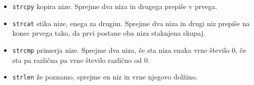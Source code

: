 \begin{itemize}
    \item \verb+strcpy+ kopira nize. Sprejme dva niza in drugega prepiše v
        prvega.
    \item \verb+strcat+ stika nize, enega za drugim. Sprejme dva niza in drugi
        niz prepiše na konec prvega tako, da prvi postane oba niza staknjena
        skupaj.
    \item \verb+strcmp+ primerja nize. Sprejme dva niza, če sta niza enaka vrne
        število 0, če sta pa različna pa vrne število različno od 0.
    \item \verb+strlen+ že poznamo, sprejme en niz in vrne njegovo dolžino.
\end{itemize}

\begin{examples}
\end{examples}


